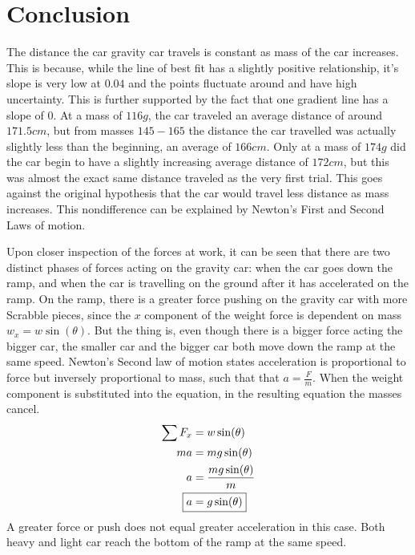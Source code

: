 \documentclass[12pt]{article}
\begin{document}
\section{Conclusion}
The distance the car gravity car travels is constant as mass of the car increases. This is because, while the line of best fit has a slightly positive relationship, it's slope is very low at \(0.04\) and the points fluctuate around and have high uncertainty. This is further supported by the fact that one gradient line has a slope of \(0\). At a mass of \(116g\), the car traveled an average distance of around \(171.5cm\), but from masses \(145-165\) the distance the car travelled was actually slightly less than the beginning, an average of \(166cm\). Only at a mass of \(174g\) did the car begin to have a slightly increasing average distance of \(172cm\), but this was almost the exact same distance traveled as the very first trial. This goes against the original hypothesis that the car would travel less distance as mass increases. This nondifference can be explained by Newton's First and Second Laws of motion.

Upon closer inspection of the forces at work, it can be seen that there are two distinct phases of forces acting on the gravity car: when the car goes down the ramp, and when the car is travelling on the ground after it has accelerated on the ramp. On the ramp, there is a greater force pushing on the gravity car with more Scrabble pieces, since the \(x\) component of the weight force is dependent on mass \(w_x = w\sin(\theta)\). But the thing is, even though there is a bigger force acting the bigger car, the smaller car and the bigger car both move down the ramp at the same speed. Newton's Second law of motion states acceleration is proportional to force but inversely proportional to mass, such that that \(a=\frac{F}{m}\). When the weight component is substituted into the equation, in the resulting equation the masses cancel.
\begin{align*}
	\sum F_x &= w\sin(\theta) \\
	ma &= mg\sin(\theta) \\
	a &= \frac{mg\sin(\theta)}{m}\\
	\Aboxed{a &=g\sin(\theta)}
\end{align*}
A greater force or push does not equal greater acceleration in this case. Both heavy and light car reach the bottom of the ramp at the same speed. 
\end{document}
